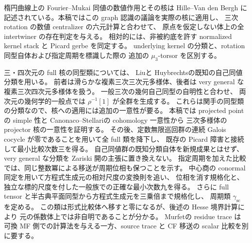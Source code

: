 \documentclass[11pt,a4paper]{ltjsarticle}
\numberwithin{equation}{section}
\begin{document}
楕円曲線上の Fourier--Mukai 同値の数値作用とその核は
Hille--Van den Bergh\cite[Proposition~4.2, Corollary~4.3, Theorem~5.3]{NFMHilleVdBFM}
に記述されている。本稿ではこの graph 認識の議論を実際の核に適用し、
三次 rotation の数値 centralizer の六元計算と合わせて、
原点を仮定しない体上の全 intertwiner の存在判定を与える。
相対的には、非被約底を許す normalized kernel stack と Picard gerbe を同定する。
underlying kernel の分類と、rotation 同型自体および指定周期を標識した際の
追加の $\mu_3$-torsor を区別する。

三・四次元の full 核の同型類については、
Liu\cite[Theorem~4.13]{NFMLiuCubicThreefoldAut}と
Huybrechts\cite[Theorem~1.2(i)]{NFMHuybrechtsK3Cubic}の既知の自己同値分類を用いる。
前者は滑らかな複素三次三次元多様体、後者は very general な複素三次四次元多様体を扱う。
一般三次の幾何自己同型の自明性\cite[Theorems~1.1, 1.5]{NFMPoonenAutomorphisms}と合わせ、
両次元の幾何学的一般点では $\rho^{-1}[1]$ が全群を生成する。
これらは関手の同型類の分類なので、核への適用には追加の一意性が要る。
本稿では projected point の simple 性と
Canonaco--Stellari\cite[Corollary~4.4]{NFMCanonacoStellariKernels}の cohomology 一意性から
三次多様体の projector 核の一意性を証明する。
その後、定数無限巡回群の連続 Galois cocycle が零であることを用いて全 full 類を降下し、
既存の Picard 障害と接続して最小比較次数三を得る。
自己同値群の既知分類自体を新規成果とはせず、very general な分類を Zariski 開の主張に置き換えない。
指定周期を加えた比較では、同じ整数冪による移送が周期位相も保つことを示す。
中心商の conormal 同定を用いて方程式生成元の相対尺度の変換則を追い、
位相を消す規格化と、独立な標的尺度を付した一般族での正確な最小次数九を得る。
さらに full tensor と半古典平面同型から方程式生成元を三乗倍まで規格化し、
周期類 $\gamma_{\mathrm{sc}}$ を定める。
この類は形式比較体へ移すと零になるが、後述の Hesse 境界計算により
元の係数体上では非自明であることが分かる。
Murfet\cite[Theorem~6.2, equation~(6.6)]{NFMMurfetResidue}の residue trace は
可換 MF 側での計算法を与える一方、source trace と CF 移送の scalar 比較を別に要する。
\end{document}
